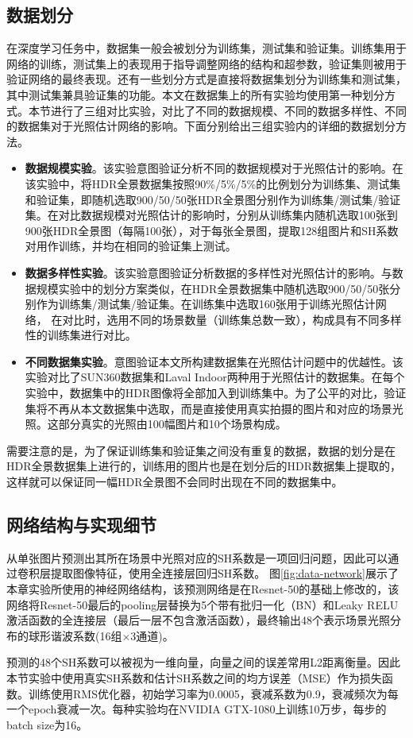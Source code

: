 \subsection{数据划分}
在深度学习任务中，数据集一般会被划分为训练集，测试集和验证集。训练集用于网络的训练，测试集上的表现用于指导调整网络的结构和超参数，验证集则被用于验证网络的最终表现。还有一些划分方式是直接将数据集划分为训练集和测试集，其中测试集兼具验证集的功能。本文在数据集上的所有实验均使用第一种划分方式。本节进行了三组对比实验，对比了不同的数据规模、不同的数据多样性、不同的数据集对于光照估计网络的影响。下面分别给出三组实验内的详细的数据划分方法。
\begin{itemize}
    \item \textbf{数据规模实验}。该实验意图验证分析不同的数据规模对于光照估计的影响。在该实验中，将HDR全景数据集按照90\%/5\%/5\%的比例划分为训练集、测试集和验证集，即随机选取900/50/50张HDR全景图分别作为训练集/测试集/验证集。在对比数据规模对光照估计的影响时，分别从训练集内随机选取100张到900张HDR全景图（每隔100张），对于每张全景图，提取128组图片和SH系数对用作训练，并均在相同的验证集上测试。
    \item \textbf{数据多样性实验}。该实验意图验证分析数据的多样性对光照估计的影响。与数据规模实验中的划分方案类似，在HDR全景数据集中随机选取900/50/50张分别作为训练集/测试集/验证集。在训练集中选取160张用于训练光照估计网络， 在对比时，选用不同的场景数量（训练集总数一致），构成具有不同多样性的训练集进行对比。
    \item \textbf{不同数据集实验}。意图验证本文所构建数据集在光照估计问题中的优越性。该实验对比了SUN360\cite{xiao2012recognizing}数据集和Laval Indoor\cite{gardner2017learning}两种用于光照估计的数据集。在每个实验中，数据集中的HDR图像将全部加入到训练集中。为了公平的对比，验证集将不再从本文数据集中选取，而是直接使用真实拍摄的图片和对应的场景光照。这部分真实的光照由100幅图片和10个场景构成。
\end{itemize}

需要注意的是，为了保证训练集和验证集之间没有重复的数据，数据的划分是在HDR全景数据集上进行的，训练用的图片也是在划分后的HDR数据集上提取的，这样就可以保证同一幅HDR全景图不会同时出现在不同的数据集中。
\subsection{网络结构与实现细节}
从单张图片预测出其所在场景中光照对应的SH系数是一项回归问题，因此可以通过卷积层提取图像特征，使用全连接层回归SH系数。
图\ref{fig:data-network}展示了本章实验所使用的神经网络结构，该预测网络是在Resnet-50\cite{he2016deep}的基础上修改的，该网络将Resnet-50最后的pooling层替换为5个带有批归一化（BN）\cite{ioffe2015batch}和Leaky RELU激活函数\cite{maas2013rectifier}的全连接层（最后一层不包含激活函数），最终输出48个表示场景光照分布的球形谐波系数(16组$\times$3通道)。

预测的48个SH系数可以被视为一维向量，向量之间的误差常用L2距离衡量。因此本节实验中使用真实SH系数和估计SH系数之间的均方误差（MSE）作为损失函数。训练使用RMS优化器\cite{tieleman2012lecture}，初始学习率为0.0005，衰减系数为0.9，衰减频次为每一个epoch衰减一次。每种实验均在NVIDIA GTX-1080上训练10万步，每步的batch size为16。

